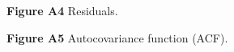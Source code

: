 \documentclass[notitlepage]{article}
\begin{document}
\begin{center}
\textbf{Figure A4} Residuals.
\end{center}

\begin{center}
\textbf{Figure A5} Autocovariance function (ACF).
\end{center}
\end{document}
